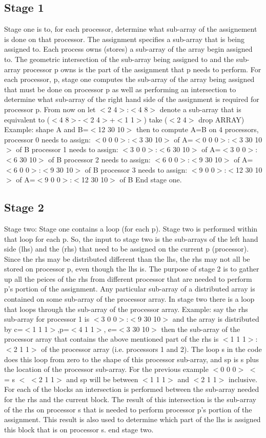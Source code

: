 \subsection*{Stage 1}
Stage one is to, for each processor, 
determine what sub-array of the assignement is done on that processor.
The assignment specifies a sub-array that is being assigned to.  Each
process owns (stores) a sub-array of the array begin assigned to.  The
geometric intersection of the sub-array being assigned to and the 
sub-array processor p owns is the part of the assignment that p needs to
perform.  For each processor, p, stage one computes the sub-array
of the array being assigned that must be done on processor p as well
as performing an intersection to determine what sub-array of the 
right hand side of the assignment is required for processor p. 
From now on let $<$2 4$>$:$<$4 8$>$ denote a sub-array that is equivalent
to ($<$4 8$>$-$<$2 4$>$+$<$1 1$>$) take ($<$2 4$>$ drop ARRAY)
Example: shape A and B=$<$12 30 10$>$ then to compute A=B on 4 processors,
processor 0 needs to assign:
$<$0 0 0$>$:$<$3 30 10$>$ of A=$<$0 0 0$>$:$<$3 30 10$>$ of B
processor 1 needs to assign:
$<$3 0 0$>$:$<$6 30 10$>$ of A=$<$3 0 0$>$:$<$6 30 10$>$ of B
processor 2 needs to assign:
$<$6 0 0$>$:$<$9 30 10$>$ of A=$<$6 0 0$>$:$<$9 30 10$>$ of B
processor 3 needs to assign:
$<$9 0 0$>$:$<$12 30 10$>$ of A=$<$9 0 0$>$:$<$12 30 10$>$ of B
End stage one.
\subsection*{Stage 2}
Stage two: Stage one contains a loop (for each p).  Stage two is performed
within that loop for each p.  So, the input to stage two is the sub-arrays
of the left hand side (lhs) and the (rhs) that need to be assigned on
the current p (processor).  Since the rhs may be distributed different
than the lhs, the rhs may not all be stored on processor p, even though
the lhs is.  The purpose of stage 2 is to gather up all the peices of
the rhs from different processor that are needed to perform p's portion
of the assignment.  Any particular sub-array of a distributed array
is contained on some sub-array of the processor array.  In stage
two there is a loop that loops through the sub-array of the processor
array.  Example: say the rhs sub-array for processor 1 is 
$<$3 0 0$>$:$<$9 30 10$>$ and the array is distributed by c=$<$1 1 1$>$,p=$<$4 1 1$>$,
e=$<$3 30 10$>$ then the sub-array of the processor array that contains
the above mentioned part of the rhs is $<$1 1 1$>$:$<$2 1 1$>$ of the processor
array (i.e. processors 1 and 2).
The loop s in the code does this loop from zero to the shape of this
processor sub-array, and sp is s plus the location of the processor
sub-array.  For the previous example $<$0 0 0$>$ $<$= s $<$ $<$2 1 1$>$ and
sp will be between $<$1 1 1$>$ and $<$2 1 1$>$ inclusive.
For each of the blocks an intersection is performed between the sub-array
needed for the rhs and the current block.  The result of this 
intersection is the sub-array of the rhs on processor s that is needed to
perform processor p's portion of the assignment.  This result is also
used to determine which part of the lhs is assigned this block that is
on processor s.
end stage two.
